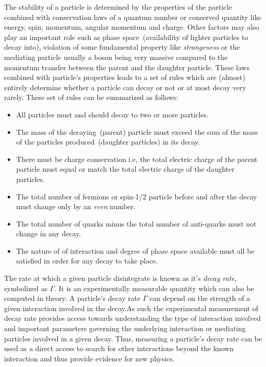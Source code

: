 {%
The stability of a particle is determined by the properties of the particle combined with  conservation laws of a quantum number or conserved quantity like energy, spin, momentum, angular momentum and charge. Other factors may also play an important role such as phase space~(availability of lighter particles to decay into), violation of some fundamental property like \textit{strangeness} or the mediating particle usually a boson being very massive compared to the momentum transfer between the parent and the daughter particle. These laws combined with particle's properties leads to a set of rules which are (almost) entirely determine whether a particle can decay or not or at most decay very rarely.  
These set of rules can be summarized as follows:
\begin{itemize}
\item All particles must and should decay to two or more particles.
\item The mass of the decaying~(parent) particle must exceed the sum of the mass  of the particles produced~(daughter particles) in its decay.
\item There must be charge conservation i.e, the total electric charge of the parent particle must equal or match the total electric charge of the daughter particles.
\item The total number of fermions or spin-1/2 particle before and after the decay must change only by an \textit{even} number.
\item The total number of quarks minus the total number of anti-quarks must not change in any decay.
\item The nature of of interaction and degree of phase space available must all be satisfied in order for any decay to take place.
\end{itemize}

The rate at which a given particle disintegrate  is known as it's \textit{decay rate}, symbolized as \textbf{$\Gamma$}. It is an experimentally measurable quantity which can also be computed in theory. A particle's decay rate $\Gamma$ can depend on the strength of a given interaction involved in the decay.As such the experimental measurement of decay rate provides access towards understanding the type of interaction involved and important parameters governing the underlying interaction or mediating particles involved in a given decay. Thus, measuring a particle's decay rate can be used as a direct access to search for other interactions beyond the known interaction and thus provide evidence for new physics. 

}
